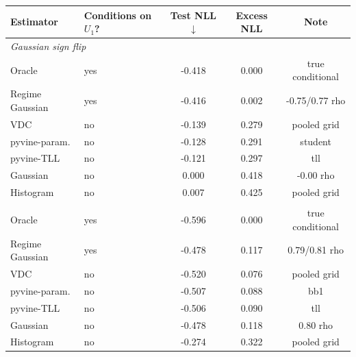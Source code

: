 \begin{tabular}{llccc}
\toprule
Estimator & Conditions on $U_1$? & Test NLL $\downarrow$ & Excess NLL & Note \\
\midrule
\multicolumn{5}{l}{\emph{Gaussian sign flip}}\\
Oracle & yes & -0.418 & 0.000 & true conditional \\
Regime Gaussian & yes & -0.416 & 0.002 & -0.75/0.77 rho \\
VDC & no & -0.139 & 0.279 & pooled grid \\
pyvine-param. & no & -0.128 & 0.291 & student \\
pyvine-TLL & no & -0.121 & 0.297 & tll \\
Gaussian & no & 0.000 & 0.418 & -0.00 rho \\
Histogram & no & 0.007 & 0.425 & pooled grid \\
\addlinespace[0.25em]
\multicolumn{5}{l}{\emph{Clayton/Gumbel tail switch}}\\
Oracle & yes & -0.596 & 0.000 & true conditional \\
Regime Gaussian & yes & -0.478 & 0.117 & 0.79/0.81 rho \\
VDC & no & -0.520 & 0.076 & pooled grid \\
pyvine-param. & no & -0.507 & 0.088 & bb1 \\
pyvine-TLL & no & -0.506 & 0.090 & tll \\
Gaussian & no & -0.478 & 0.118 & 0.80 rho \\
Histogram & no & -0.274 & 0.322 & pooled grid \\
\bottomrule
\end{tabular}
